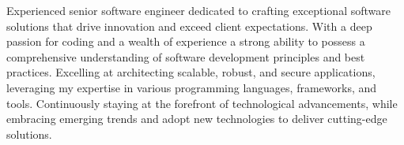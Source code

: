 

Experienced senior software engineer dedicated to crafting exceptional software solutions that drive innovation and exceed client expectations. With a deep passion for coding and a wealth of experience a strong ability to possess a comprehensive understanding of software development principles and best practices. Excelling at architecting scalable, robust, and secure applications, leveraging my expertise in various programming languages, frameworks, and tools. Continuously staying at the forefront of technological advancements, while embracing emerging trends and adopt new technologies to deliver cutting-edge solutions. 